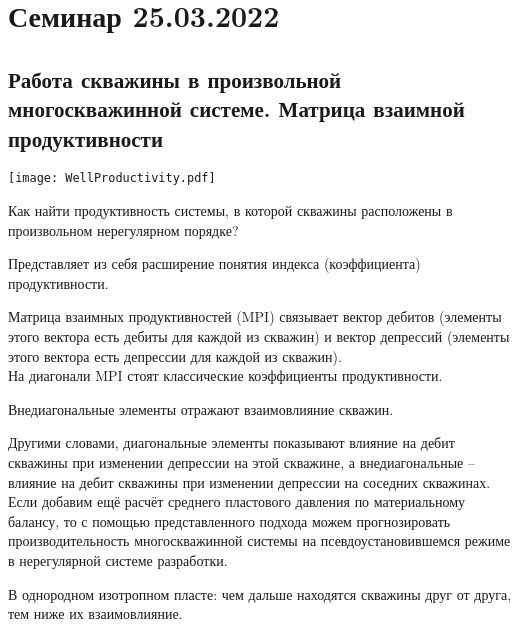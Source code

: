 \documentclass[main.tex]{subfiles}
\begin{document}
\section{Семинар 25.03.2022}

\subsection{Работа скважины в произвольной многоскважинной системе. Матрица взаимной продуктивности}

\texttt{[image: WellProductivity.pdf]}

Как найти продуктивность системы, в которой скважины расположены в произвольном нерегулярном порядке?



Представляет из себя расширение понятия индекса (коэффициента) продуктивности.

Матрица взаимных продуктивностей (MPI) связывает вектор дебитов (элементы этого вектора есть дебиты для каждой из скважин) и вектор депрессий (элементы этого вектора есть депрессии для каждой из скважин).\\

На диагонали MPI стоят классические коэффициенты продуктивности.

Внедиагональные элементы отражают взаимовлияние скважин.

Другими словами, диагональные элементы показывают влияние на дебит скважины при изменении депрессии на этой скважине, а внедиагональные -- влияние на дебит скважины при изменении депрессии на соседних скважинах.\\

Если добавим ещё расчёт среднего пластового давления по материальному балансу, то с помощью представленного подхода можем прогнозировать производительность многоскважинной системы на псевдоустановившемся режиме в нерегулярной системе разработки.

В однородном изотропном пласте: чем дальше находятся скважины друг от друга, тем ниже их взаимовлияние.

\end{document}
